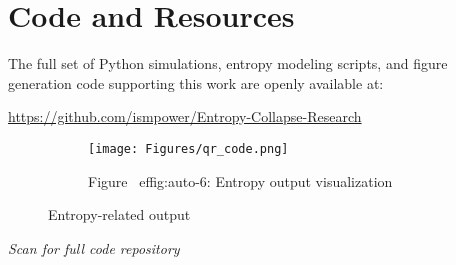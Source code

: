 \documentclass[12pt]{article}
\begin{document}
\section*{Code and Resources}

The full set of Python simulations, entropy modeling scripts, and figure generation code supporting this work are openly available at:
\begin{center}
\url{https://github.com/ismpower/Entropy-Collapse-Research}
\begin{figure}[H]
\centering
\begin{figure}[H]
\centering
\texttt{[image: Figures/qr\_code.png]}
\caption{Figure~
ef{fig:auto-6}: Entropy output visualization}
\label{fig:auto-6}
\end{figure}
\caption{Entropy-related output}
\label{fig:Figures_qr_code_png}
\end{figure}

\textit{Scan for full code repository}\

\end{center}
\end{document}
